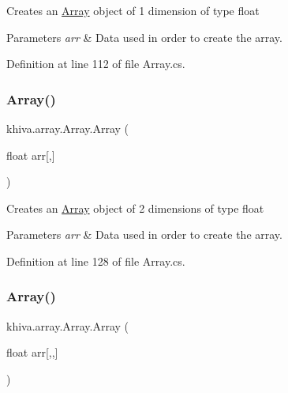 Creates an \mbox{\hyperlink{classkhiva_1_1array_1_1_array}{Array}} object of 1 dimension of type float 


\begin{DoxyParams}{Parameters}
{\em arr} & Data used in order to create the array.\\
\hline
\end{DoxyParams}


Definition at line 112 of file Array.\+cs.

\mbox{\label{classkhiva_1_1array_1_1_array_aad963c08b59b6dc77a59f8b8c14d9a05}} 
\subsubsection{\texorpdfstring{Array()}{Array()}\hspace{0.1cm}{\footnotesize\ttfamily [2/46]}}
{\footnotesize\ttfamily khiva.\+array.\+Array.\+Array (\begin{DoxyParamCaption}\item[{float}]{arr\mbox{[},\mbox{]} }\end{DoxyParamCaption})\hspace{0.3cm}{\ttfamily [inline]}}



Creates an \mbox{\hyperlink{classkhiva_1_1array_1_1_array}{Array}} object of 2 dimensions of type float 


\begin{DoxyParams}{Parameters}
{\em arr} & Data used in order to create the array.\\
\hline
\end{DoxyParams}


Definition at line 128 of file Array.\+cs.

\mbox{\label{classkhiva_1_1array_1_1_array_a1dedcbb4b8d015d0f18ec811d034a092}} 
\subsubsection{\texorpdfstring{Array()}{Array()}\hspace{0.1cm}{\footnotesize\ttfamily [3/46]}}
{\footnotesize\ttfamily khiva.\+array.\+Array.\+Array (\begin{DoxyParamCaption}\item[{float}]{arr\mbox{[},,\mbox{]} }\end{DoxyParamCaption})\hspace{0.3cm}{\ttfamily [inline]}}



